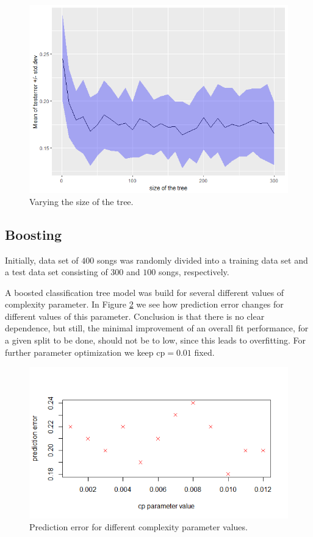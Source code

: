 \documentclass{article}
\begin{document}
\begin{figure}[htp!]
  \centering
  \includegraphics[height=0.5\textwidth] {figs/treesize.png}
  \caption{Varying the size of the tree.}
  \label{fig:treesize}
\end{figure}

\subsection{Boosting}

Initially, data set of $400$ songs was randomly divided into a training data set and a test data set consisting of $300$ and $100$ songs, respectively. 

A boosted classification tree model was build for several different values of complexity parameter. In Figure \ref{fig:complexity_parameter_values} we see how prediction error changes for different values of this parameter. Conclusion is that there is no clear dependence, but still, the minimal improvement of an overall fit performance, for a given split to be done, should not be to low, since this leads to overfitting. For further parameter optimization we keep {\selectfont cp$=0.01$} fixed.
 
 \begin{figure}[h] %
\includegraphics[scale=0.65]{figs/cp_values.png}
\centering
\caption{Prediction error for different complexity parameter values.} \label{fig:complexity_parameter_values}
\end{figure}
 
\end{document}
